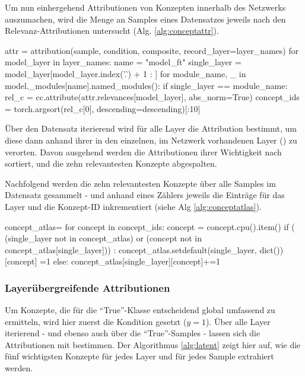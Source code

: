 Um nun einhergehend Attributionen von Konzepten innerhalb des Netzwerks auszumachen, wird die Menge an Samples eines Datensatzes jeweils nach den Relevanz-Attributionen untersucht (Alg. \ref{alg:conceptattr}).
\begin{python}[caption={Ermittlung der Relevanzen an jedem einzelnen Sample (Auszug aus der Methode \lstinline{latent_attribute_imgs()})}, label=alg:conceptattr]
attr = attribution(sample, condition, composite, record_layer=layer_names)
for model_layer in layer_names:
    name = "model_ft"
    single_layer = model_layer[model_layer.index('.') + 1 : ]
    for module_name, _ in model._modules[name].named_modules():
        if single_layer == module_name:
            rel_c = cc.attribute(attr.relevances[model_layer], abs_norm=True)
            concept_ids = torch.argsort(rel_c[0], descending=descending)[:10]
\end{python}
Über den Datensatz iterierend wird für alle Layer die Attribution  bestimmt, um diese dann anhand ihrer  
in den einzelnen, im Netzwerk vorhandenen Layer () zu verorten. Davon ausgehend werden die Attributionen ihrer Wichtigkeit nach sortiert, und die zehn relevantesten Konzepte abgespalten.

Nachfolgend werden die zehn relevantesten Konzepte über alle Samples im Datensatz gesammelt - und anhand eines Zählers jeweils die Einträge für das Layer und die Konzept-ID inkrementiert (siehe Alg \ref{alg:conceptatlas}).
\newpage
\begin{python}[caption={Erstellung eines \lstinline{concept_atlas} nach einem Voting über die Konzepte über alle Samples (Auszug aus der Methode \lstinline{latent_attribute_imgs()})}, label=alg:conceptatlas]
concept_atlas={}
for concept in concept_ids:
    concept = concept.cpu().item()
    if ( (single_layer not in concept_atlas)
       or
       (concept not in concept_atlas[single_layer])) :
        concept_atlas.setdefault(single_layer, dict())[concept] =1
    else:
        concept_atlas[single_layer][concept]+=1 
\end{python}


\subsubsection{Layerübergreifende Attributionen}
Um Konzepte, die für die ``True''-Klasse entscheidend global umfassend zu ermitteln, wird hier zuerst die Kondition gesetzt ({$y=1$}). Über alle Layer iterierend - und ebenso auch über die ``True''-Samples - 
lassen sich die Attributionen mit  bestimmen. Der Algorithmus \ref{alg:latent} zeigt hier auf, wie die fünf wichtigsten Konzepte für jedes Layer und für jedes Sample extrahiert werden. 

